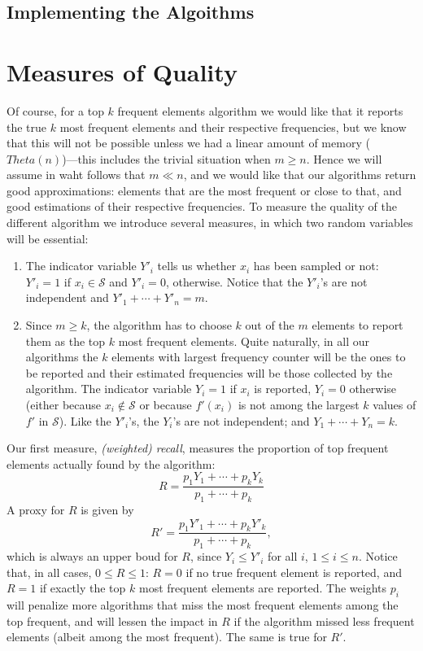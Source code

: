 \documentclass{article}
\begin{document}
\subsection{Implementing the Algoithms}

\section{Measures of Quality}
Of course, for a top $k$ frequent elements algorithm we would like
that it reports the true $k$ most frequent elements and their
respective frequencies, but we know that this will not be possible unless
we had a linear amount of memory ($Theta(n)$)---this includes
the trivial situation when $m\ge n$. Hence we will assume in waht follows
that $m\ll n$, and we would like that
our algorithms return good approximations: elements that are
the most frequent or close to that, and good estimations of their respective
frequencies. 
To measure the quality of the different algorithm
we introduce several measures, in which
two random variables will be essential:
\begin{enumerate}
\item The indicator variable $Y'_i$ tells us whether $x_i$
  has been sampled or not: $Y'_i=1$
  if $x_i\in\mathcal{S}$ and $Y'_i=0$, otherwise. Notice that the $Y'_i$'s
  are not independent and $Y'_1+\cdots+Y'_n=m$.
\item Since $m\ge k$, the algorithm has to choose $k$ out of the $m$
  elements to report them as the top $k$ most frequent elements.
  Quite naturally, in all our algorithms the $k$ elements with largest
  frequency counter will be the ones to be reported and their estimated
  frequencies will be those collected by the algorithm. The indicator
  variable $Y_i=1$ if $x_i$ is reported, $Y_i=0$ otherwise
  (either because $x_i\not\in\mathcal{S}$ or because
  $f'(x_i)$ is not among the largest
  $k$ values of $f'$ in $\mathcal{S}$). Like the $Y'_i$'s, the $Y_i$'s
  are not independent; and $Y_1+\cdots+Y_n=k$.
\end{enumerate}

Our first measure, \emph{(weighted) recall}, measures the proportion of
top frequent elements actually found by the algorithm:
\[
R = \frac{p_1 Y_1+\cdots+p_k Y_k}{p_1+\cdots+p_k}
\]
A proxy for $R$ is given by
\[
R' = \frac{p_1 Y'_1+\cdots+p_k Y'_k}{p_1+\cdots+p_k}, 
\]
which is always an upper boud for $R$, since $Y_i \le Y'_i$ for all $i$,
$1\le i\le n$.
Notice that, in all cases, $0\le R\le 1$: $R=0$ if no true frequent element
is reported, and $R=1$ if exactly the top $k$ most frequent elements
are reported. The weights $p_i$ will penalize more algorithms that miss
the most frequent elements among the top frequent, and will lessen the
impact in $R$ if the algorithm missed less frequent elements
(albeit among the most frequent). The same is true for $R'$.
\end{document}
